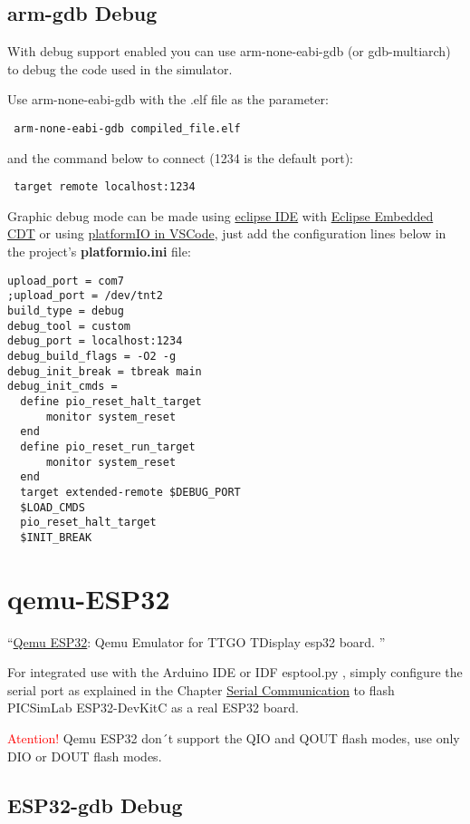  \subsection{arm-gdb Debug} \hypertarget{def:gdbarm}{}
 
 With debug support enabled you can use arm-none-eabi-gdb (or gdb-multiarch) to debug the code used in the simulator. 
 
 Use arm-none-eabi-gdb with the .elf file as the parameter:
 \begin{verbatim}
 arm-none-eabi-gdb compiled_file.elf
 \end{verbatim}
 and the command below to connect (1234 is the default port):
 \begin{verbatim}
 target remote localhost:1234
 \end{verbatim}

Graphic debug mode can be made using \href{https://www.eclipse.org/}{eclipse IDE} with 
\href{https://projects.eclipse.org/projects/iot.embed-cdt}{Eclipse Embedded CDT} or using \href{https://platformio.org/}{platformIO in VSCode}, just add the configuration lines below in the project's \textbf{platformio.ini} file:
\begin{verbatim}
upload_port = com7
;upload_port = /dev/tnt2
build_type = debug
debug_tool = custom
debug_port = localhost:1234
debug_build_flags = -O2 -g
debug_init_break = tbreak main
debug_init_cmds =
  define pio_reset_halt_target
      monitor system_reset
  end
  define pio_reset_run_target
      monitor system_reset
  end
  target extended-remote $DEBUG_PORT
  $LOAD_CMDS
  pio_reset_halt_target
  $INIT_BREAK
\end{verbatim}

\section{qemu-ESP32} \hypertarget{def:qemu-esp32}{}
 ``\href{https://github.com/a159x36/qemu}{Qemu ESP32}: Qemu Emulator for TTGO TDisplay esp32 board. ''
  
For integrated use with the Arduino IDE or IDF esptool.py , simply configure the serial port as explained 
in the Chapter \hyperlink{def:seriali}{Serial Communication} to flash PICSimLab ESP32-DevKitC as a real ESP32 board.

 \textcolor{red}{Atention!} Qemu ESP32 don´t support the QIO and QOUT flash modes, use only DIO or DOUT flash modes. 
 
\subsection{ESP32-gdb Debug} \hypertarget{def:gdbesp}{}

